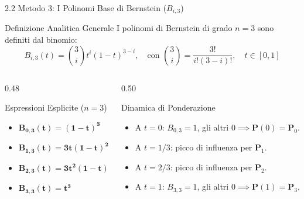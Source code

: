 \documentclass[aspectratio=169, 10pt]{beamer}
\begin{document}
\begin{frame}{2.2 Metodo 3: I Polinomi Base di Bernstein ($B_{i,3}$)}
    \begin{block}{Definizione Analitica Generale}
        I polinomi di Bernstein di grado $n=3$ sono definiti dal binomio:
        $$B_{i,3}(t) = \binom{3}{i} t^i (1-t)^{3-i}, \quad \text{con } \binom{3}{i} = \frac{3!}{i!(3-i)!}, \quad t \in [0, 1]$$
    \end{block}
    \vspace{0.1cm}
    \begin{columns}[T]
        \begin{column}{0.48\textwidth}
            \begin{block}{Espressioni Esplicite ($n=3$)}
                \begin{itemize}
                    \item $\mathbf{B_{0,3}(t) = (1-t)^3}$
                    \item $\mathbf{B_{1,3}(t) = 3t(1-t)^2}$
                    \item $\mathbf{B_{2,3}(t) = 3t^2(1-t)}$
                    \item $\mathbf{B_{3,3}(t) = t^3}$
                \end{itemize}
            \end{block}
        \end{column}
        \begin{column}{0.50\textwidth}
            \begin{exampleblock}{Dinamica di Ponderazione}
                \footnotesize
                \begin{itemize}
                    \item A $t=0$: $B_{0,3}=1$, gli altri $0 \implies \mathbf{P}(0) = \mathbf{P}_0$.
                    \item A $t=1/3$: picco di influenza per $\mathbf{P}_1$.
                    \item A $t=2/3$: picco di influenza per $\mathbf{P}_2$.
                    \item A $t=1$: $B_{3,3}=1$, gli altri $0 \implies \mathbf{P}(1) = \mathbf{P}_3$.
                \end{itemize}
            \end{exampleblock}
        \end{column}
    \end{columns}
\end{frame}
\end{document}
